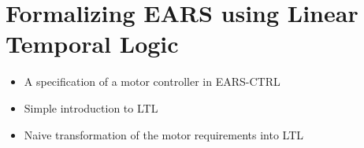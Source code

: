 \section{Formalizing EARS using Linear Temporal Logic}

\begin{itemize}
  \item A specification of a motor controller in EARS-CTRL
  \item Simple introduction to LTL
  \item Naive transformation of the motor requirements into LTL
\end{itemize}